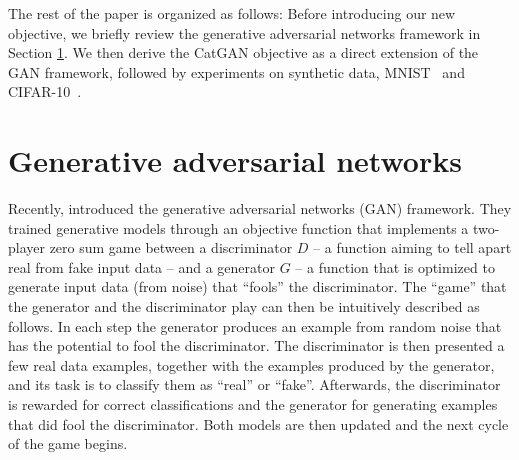 \documentclass{article} \usepackage{iclr2016_conference,times}
\newcommand{\TODO}[2][JTS]{}
\begin{document}
The rest of the paper is organized as follows: Before introducing our
new objective, we briefly review the generative adversarial networks
framework in Section \ref{sect:gan}. We then derive the CatGAN
objective as a direct extension of the GAN framework, followed by
experiments on synthetic data, MNIST~\citep{LeCun_NC1989} and
CIFAR-10~\citep{Krizhevsky2009}.

\TODO{I currently interchangeably use samples and examples, I should
  really change notation to be consistent! }

\TODO{Also check and make uses of category vs. class consistent.}

\TODO{unsupervisedly ?}

\section{Generative adversarial networks}
\label{sect:gan}
Recently, \citet{Goodfellow_NIPS2014} introduced the generative adversarial
networks (GAN) framework. They trained generative models through an
objective function that implements a two-player zero sum game between
a discriminator $D$ -- a function aiming to tell apart real from fake
input data -- and a generator $G$ -- a function that is optimized to generate
input data (from noise) that ``fools'' the discriminator. The ``game''
that the generator and the discriminator play can then be intuitively
described as follows. In each step the generator produces an
example from random noise that has the potential to fool the
discriminator. The discriminator is then presented a few real data
examples, together with the examples produced by the generator, and
its task is to classify them as ``real'' or ``fake''. Afterwards, the
discriminator is rewarded for correct classifications and the generator
for generating examples that did fool the discriminator. Both
models are then updated and the next cycle of the game begins.
\end{document}

